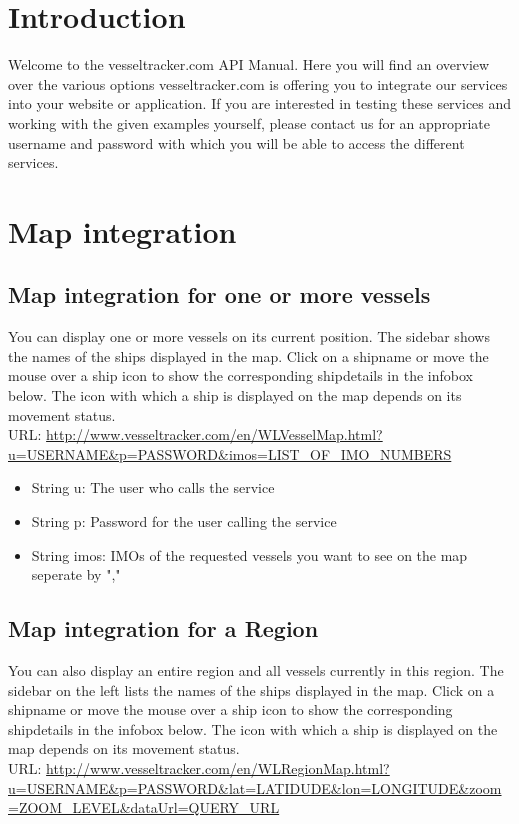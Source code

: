 \section{Introduction}
Welcome to the vesseltracker.com API Manual. Here you will find an overview over the various options vesseltracker.com is offering you to integrate our services into your website or application. 
If you are interested in testing these services and working with the given examples yourself, please contact us for an appropriate username and password with which you will be able to access the different services.

\section{Map integration}
\subsection{Map integration for one or more vessels}
You can display one or more vessels on its current position. The sidebar shows the names of the ships displayed in the map. Click on a shipname or move the mouse over a ship icon to show the corresponding shipdetails in the infobox below. The icon with which a ship is displayed on the map depends on its movement status.\\ 
URL: \url{http://www.vesseltracker.com/en/WLVesselMap.html?u=USERNAME\&p=PASSWORD\&imos=LIST_OF_IMO_NUMBERS}

\begin{itemize}
  \item String u: The user who calls the service
  \item String p: Password for the user calling the service
  \item String imos: IMOs of the requested vessels you want to see on the map seperate by ","
\end{itemize}


\subsection{Map integration for a Region}
You can also display an entire region and all vessels currently in this region. The sidebar on the left lists the names of the ships displayed in the map. Click on a shipname or move the mouse over a ship icon to show the corresponding shipdetails in the infobox below. The icon with which a ship is displayed on the map depends on its movement status.\\
URL: \url{http://www.vesseltracker.com/en/WLRegionMap.html?u=USERNAME\&p=PASSWORD\&lat=LATIDUDE\&lon=LONGITUDE\&zoom=ZOOM_LEVEL\&dataUrl=QUERY_URL} 

